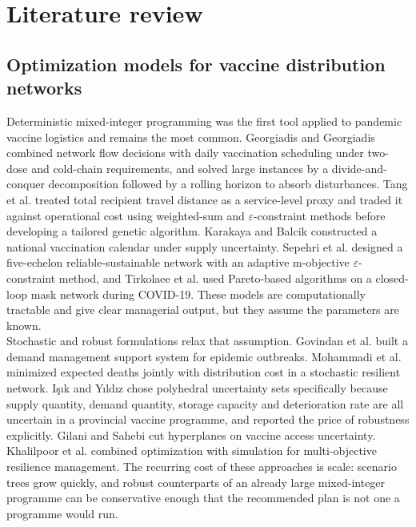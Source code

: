 \documentclass[a4paper]{elsarticle}
\begin{document}
{\section{Literature review}
\label{sec:litreview}
\subsection{Optimization models for vaccine distribution networks}
Deterministic mixed-integer programming was the first tool applied to pandemic vaccine logistics and remains the most common. Georgiadis and Georgiadis \cite{Georgiadis:2021} combined network flow decisions with daily vaccination scheduling under two-dose and cold-chain requirements, and solved large instances by a divide-and-conquer decomposition followed by a rolling horizon to absorb disturbances. Tang et al. \cite{Tang:2022}  treated total recipient travel distance as a service-level proxy and traded it against operational cost using weighted-sum and $\varepsilon$-constraint methods before developing a tailored genetic algorithm. Karakaya and Balcik  \cite{Karakaya:2024} constructed a national vaccination calendar under supply uncertainty. Sepehri et al. \cite{Sepehri:2024} designed a five-echelon reliable-sustainable network with an adaptive m-objective $\varepsilon$-constraint method, and Tirkolaee et al. \cite{Tirkolaee:2022}  used Pareto-based algorithms on a closed-loop mask network during COVID-19. These models are computationally tractable and give clear managerial output, but they assume the parameters are known.\\
Stochastic and robust formulations relax that assumption. Govindan et al. \cite{Govindan:2020} built a demand management support system for epidemic outbreaks. Mohammadi et al. \cite{Mohammadi:2022} minimized expected deaths jointly with distribution cost in a stochastic resilient network.  I\c{s}{\i}k and Y{\i}ld{\i}z \cite{Isik:2023} chose polyhedral uncertainty sets specifically because supply quantity, demand quantity, storage capacity and deterioration rate are all uncertain in a provincial vaccine programme, and reported the price of robustness explicitly. Gilani and Sahebi \cite{Gilani:2022} cut hyperplanes on vaccine access uncertainty. Khalilpoor et al. \cite{Khalilpoor:2025} combined optimization with simulation for multi-objective resilience management. The recurring cost of these approaches is scale: scenario trees grow quickly, and robust counterparts of an already large mixed-integer programme can be conservative enough that the recommended plan is not one a programme would run.\\
}
\end{document}
